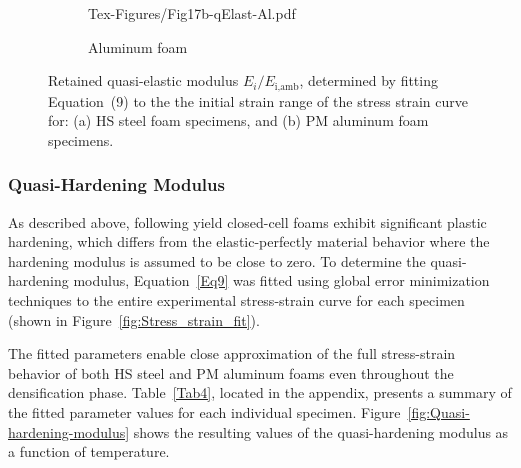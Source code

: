 \documentclass[review]{elsarticle}
\begin{document}
\begin{figure}
\begin{subfigure}{0.50\textwidth}
		{Tex-Figures/Fig17b-qElast-Al.pdf}
		\caption{Aluminum foam}
		\label{fig:Quasi-elast-modulus_Al}
	\end{subfigure}
	\caption{Retained quasi-elastic modulus $E_i/E_\text{i,amb}$, determined by fitting Equation~(9) to the the initial strain range of the stress strain curve for: (a) HS steel foam specimens, and (b) PM aluminum foam specimens.}
	\label{fig:Quasi-elast-modulus}
\end{figure}

\subsubsection{Quasi-Hardening Modulus}

As described above, following yield closed-cell foams exhibit significant plastic hardening, which differs from the elastic-perfectly material behavior where the hardening modulus is assumed to be close to zero. To determine the quasi-hardening modulus, Equation~\ref{Eq9} was fitted using global error minimization techniques to the entire experimental stress-strain curve for each specimen (shown in Figure~\ref{fig:Stress_strain_fit}).

The fitted parameters enable close approximation of the full stress-strain behavior of both HS steel and PM aluminum foams even throughout the densification phase. Table~\ref{Tab4}, located in the appendix, presents a summary of the fitted parameter values for each individual specimen. Figure~\ref{fig:Quasi-hardening-modulus} shows the resulting values of the quasi-hardening modulus as a function of temperature.
\end{document}
